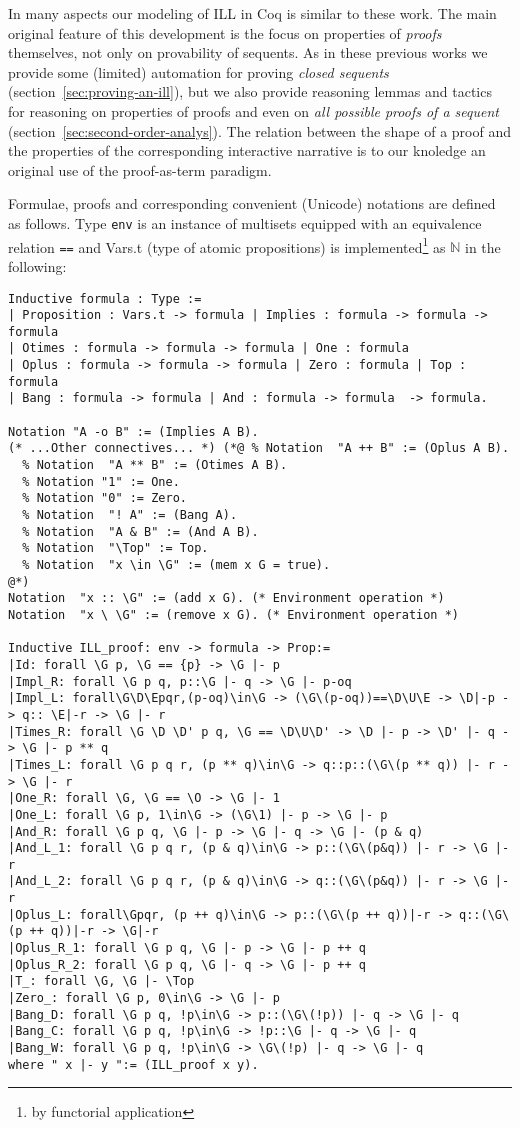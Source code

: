 \documentclass[runningheads,a4paper]{llncs}
\newcommand{\N}{\mathbb{N}}
\begin{document}
In many aspects our modeling of ILL in Coq is similar to these work.
The main original feature of this development is the focus on
properties of \emph{proofs} themselves, not only on provability of
sequents. As in these previous works we provide some (limited)
automation for proving \emph{closed sequents}
(section~\ref{sec:proving-an-ill}), but we also provide reasoning
lemmas and tactics for reasoning on properties of proofs and even on
\emph{all possible proofs of a sequent}
(section~\ref{sec:second-order-analys}). The relation between the
shape of a proof and the properties of the corresponding interactive
narrative is to our knoledge an original use of the proof-as-term
paradigm.

Formulae, proofs and corresponding convenient (Unicode) notations are
defined as follows. Type \texttt{env} is an instance of multisets
equipped with an equivalence relation \texttt{==} and Vars.t (type of
atomic propositions) is implemented\footnote{by functorial
  application} as $\N$ in the following:

\begin{lstlisting}
Inductive formula : Type := 
| Proposition : Vars.t -> formula | Implies : formula -> formula -> formula 
| Otimes : formula -> formula -> formula | One : formula 
| Oplus : formula -> formula -> formula | Zero : formula | Top : formula
| Bang : formula -> formula | And : formula -> formula  -> formula.

Notation "A -o B" := (Implies A B).
(* ...Other connectives... *) (*@ % Notation  "A ++ B" := (Oplus A B).
  % Notation  "A ** B" := (Otimes A B).
  % Notation "1" := One.
  % Notation "0" := Zero.
  % Notation  "! A" := (Bang A).
  % Notation  "A & B" := (And A B).
  % Notation  "\Top" := Top.
  % Notation  "x \in \G" := (mem x G = true).
@*)
Notation  "x :: \G" := (add x G). (* Environment operation *)
Notation  "x \ \G" := (remove x G). (* Environment operation *)
 
Inductive ILL_proof: env -> formula -> Prop:=
|Id: forall \G p, \G == {p} -> \G |- p
|Impl_R: forall \G p q, p::\G |- q -> \G |- p-oq
|Impl_L: forall\G\D\Epqr,(p-oq)\in\G -> (\G\(p-oq))==\D\U\E -> \D|-p -> q:: \E|-r -> \G |- r
|Times_R: forall \G \D \D' p q, \G == \D\U\D' -> \D |- p -> \D' |- q -> \G |- p ** q
|Times_L: forall \G p q r, (p ** q)\in\G -> q::p::(\G\(p ** q)) |- r -> \G |- r
|One_R: forall \G, \G == \O -> \G |- 1
|One_L: forall \G p, 1\in\G -> (\G\1) |- p -> \G |- p
|And_R: forall \G p q, \G |- p -> \G |- q -> \G |- (p & q)
|And_L_1: forall \G p q r, (p & q)\in\G -> p::(\G\(p&q)) |- r -> \G |- r
|And_L_2: forall \G p q r, (p & q)\in\G -> q::(\G\(p&q)) |- r -> \G |- r
|Oplus_L: forall\Gpqr, (p ++ q)\in\G -> p::(\G\(p ++ q))|-r -> q::(\G\(p ++ q))|-r -> \G|-r
|Oplus_R_1: forall \G p q, \G |- p -> \G |- p ++ q
|Oplus_R_2: forall \G p q, \G |- q -> \G |- p ++ q 
|T_: forall \G, \G |- \Top
|Zero_: forall \G p, 0\in\G -> \G |- p
|Bang_D: forall \G p q, !p\in\G -> p::(\G\(!p)) |- q -> \G |- q
|Bang_C: forall \G p q, !p\in\G -> !p::\G |- q -> \G |- q
|Bang_W: forall \G p q, !p\in\G -> \G\(!p) |- q -> \G |- q
where " x |- y ":= (ILL_proof x y).
\end{lstlisting}
\end{document}
